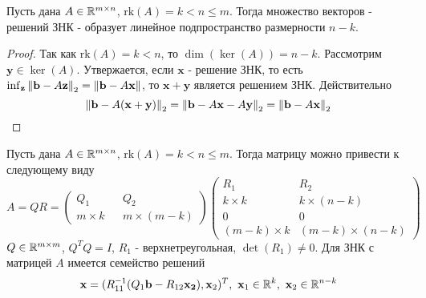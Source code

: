 \begin{theorem}
  Пусть дана $A\in\mathbb{R}^{m\times n}$, $\text{rk}(A)=k<n\leq m$.
  Тогда множество векторов - решений ЗНК - образует
  линейное подпространство размерности $n-k$.
\end{theorem}
\begin{proof}
  Так как $\text{rk}(A)=k<n$, то $\dim(\ker(A))=n-k$.
  Рассмотрим $\mathbf{y}\in\ker(A)$. Утвержается, если $\mathbf{x}$ - решение ЗНК,
  то есть $\inf_{\mathbf{z}}\left\lVert\mathbf{b}-A\mathbf{z}\right\rVert_2=\left\lVert\mathbf{b}-A\mathbf{x}\right\rVert$,
  то $\mathbf{x}+\mathbf{y}$ является решением ЗНК. Действительно
  \[\left\lVert\mathbf{b}-A(\mathbf{x}+\mathbf{y})\right\rVert_2=\left\lVert\mathbf{b}-A\mathbf{x}-A\mathbf{y}\right\rVert_2=\left\lVert\mathbf{b}-A\mathbf{x}\right\rVert_2\]
\end{proof}

\begin{theorem}
  Пусть дана $A\in\mathbb{R}^{m\times n}$, $\text{rk}(A)=k<n\leq m$.
  Тогда матрицу можно привести к следующему виду
  \[A=QR=\left(\begin{array}{cc|c}
        Q_1       &  & Q_2           \\
        m\times k &  & m\times (m-k)
      \end{array}\right)
    \left(\begin{array}{c|c}
        R_1              & R_2                  \\
        k\times k        & k\times (n-k)        \\
        \hline
        0                & 0                    \\
        (m - k) \times k & (m - k) \times (n-k)
      \end{array}\right)\]
  $Q\in\mathbb{R}^{m\times m}$, $Q^TQ=I$, $R_1$ - верхнетреугольная, $\det(R_1)\neq0$.
  Для ЗНК с матрицей $A$ имеется семейство решений
  \[\mathbf{x}=(R_{11}^{-1}(Q_1\mathbf{b}-R_{12}\mathbf{x_2}), \mathbf{x}_2)^T,\ \mathbf{x}_1\in\R^{k},\ \mathbf{x}_2\in\R^{n-k}\]
\end{theorem}
